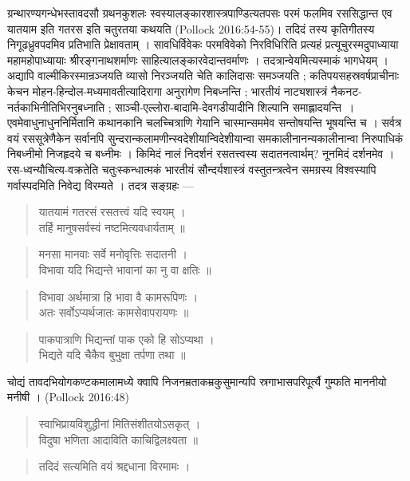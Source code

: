 {\dev ग्रन्थारण्यगन्धेभस्तावदसौ ग्रथनकुशलः स्वस्यालङ्कारशास्त्रपाण्डित्यतपसः परमं फलमिव रससिद्धान्त एव यातयाम इति गतरस इति चतुरतया कथयति} (Pollock 2016:54-55){\dev । तदिदं तस्य कृतिगीतस्य निगूढध्रुवपदमिव प्रतिभाति प्रेक्षावताम् । सावधिर्विवेकः परमविवेको निरविधिरिति प्रत्यहं प्रत्यूचुरस्मदुपाध्याया महामहोपाध्यायाः श्रीरङ्गनाथशर्माणः साहित्या\-लङ्कारवेदान्तवर्माणः । तदत्रान्वेयमित्यस्माकं भागधेयम् । अद्यापि वाल्मीकिरस्मान्रञ्जयति व्यासो निरञ्जयति चेति कालिदासः समञ्जयति ; कतिपयसहस्रवर्षप्राचीनाः केचन मोहन-हिन्दोल-मध्यमावतीत्यादिरागा अनुरागेण निबध्नन्ति ; भारतीयं नाट्यशास्त्रं नैकनट-नर्तकाभि\-नीतिभिरनुबध्नाति ; साञ्ची-एल्लोरा-बादामि-देवगडीयादीनि शिल्पानि समाह्लादयन्ति~। एव\-मेवाधुनाधुननिर्मितानि कथानकानि चलच्चित्राणि गेयानि चास्मान्सममेव सन्तोषयन्ति भूष\-यन्ति च । सर्वत्र वयं रससूत्रेणैकेन सर्वानपि सुन्दरान्कलामणीन्स्वदेशीयान्विदेशीयान्वा समकालीनानन्यकालीनान्वा निरुपाधिकं निबध्नीमो निजहृदये च बध्नीमः । किमिदं नालं निदर्शनं रसतत्त्वस्य सदातनत्वार्थम्? नूनमिदं दर्शनमेव । रस-ध्वन्यौचित्य-वक्रतेति चतुः\-स्कन्धात्मकं भारतीयं सौन्दर्यशास्त्रं वस्तुतन्त्रत्वेन समग्रस्य विश्वस्यापि गर्वास्पदमिति निवेद्य विरम्यते । तदत्र सङ्ग्रहः ---}
\begin{quote}
{\dev यातयामं गतरसं रसतत्त्वं यदि स्वयम् ।}\\
{\dev तर्हि मानुषसर्वस्वं नष्टमित्यवधार्यताम् ॥}
\end{quote}
\begin{quote}
{\dev मनसा मानवाः सर्वे मनोवृत्तिः सदातनी ।}\\
{\dev विभावा यदि भिद्यन्ते भावानां का नु वा क्षतिः ॥}
\end{quote}
\begin{quote}
{\dev विभावा अर्थमात्रा हि भावा वै कामरूपिणः ।}\\
{\dev अतः सर्वोऽप्यर्थजातः कामसेवापरायणः ॥}
\end{quote}
\begin{quote}
{\dev पाकपात्राणि भिद्यन्तां पाक एको हि सोऽप्यथा ।}\\
{\dev भिद्यते यदि चैकैव बुभुक्षा तर्पणा तथा ॥}
\end{quote}

{\dev चोद्यं तावदभियोगकण्टकमालामध्ये क्वापि निजनम्रताकम्रकुसुमान्यपि स्रगाभासपरिपूर्त्यै गुम्फति माननीयो मनीषी ।} (Pollock 2016:48)   
\begin{quote}
{\dev स्वाभिप्रायविशुद्धीनां मितिसंशीतयोऽसकृत् ।}\\
{\dev विदुषा भणिता आदाविति काचिद्विलक्ष्यता ॥}
\end{quote}
\begin{quote}
{\dev तदिदं सत्यमिति वयं श्रद्दधाना विरमामः ।}
\end{quote}

